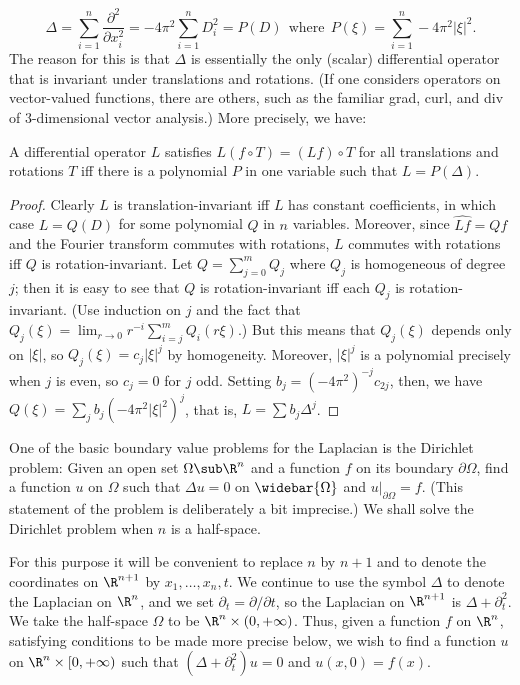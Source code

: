 \[\Delta=\sum_{i=1}^{n}\frac{\partial^2}{\partial x_i^2}=-4\pi^2\sum_{i=1}^{n}D_i^2=P(D)\ \ \text{where}\ \ P(\xi)=\sum_{i=1}^{n}-4\pi^2|\xi|^2.\]
The reason for this is that $\Delta$ is essentially the only (scalar) differential operator that is invariant under translations and rotations. (If one considers operators on vector-valued functions, there are others, such as the familiar grad, curl, and div of $3$-dimensional vector analysis.) More precisely, we have:
\begin{proposition}
A differential operator $L$ satisfies $L(f\circ T)=(Lf)\circ T$ for all translations and rotations $T$ iff there is a polynomial $P$ in one variable such that $L=P(\Delta)$.
\end{proposition}
\begin{proof}
Clearly $L$ is translation-invariant iff $L$ has constant coefficients, in which case $L=Q(D)$ for some polynomial $Q$ in $n$ variables. Moreover, since $\widehat{Lf}=Qf$ and the Fourier transform commutes with rotations, $L$ commutes with rotations iff $Q$ is rotation-invariant. Let $Q=\sum_{j=0}^{m}Q_j$ where $Q_j$ is homogeneous of degree $j$; then it is easy to see that $Q$ is rotation-invariant iff each $Q_j$ is rotation-invariant. (Use induction on $j$ and the fact that $Q_j(\xi)=\lim_{r\to 0}r^{-i}\sum_{i=j}^{m}Q_i(r\xi)$.) But this means that $Q_j(\xi)$ depends only on $|\xi|$, so $Q_j(\xi)=c_j|\xi|^j$ by homogeneity. Moreover, $|\xi|^j$ is a polynomial precisely when $j$ is even, so $c_j=0$ for $j$ odd. Setting $b_j=(-4\pi^2)^{-j}c_{2j}$, then, we have $Q(\xi)=\sum_jb_j(-4\pi^2|\xi|^2)^j$, that is, $L=\sum b_j\Delta^j$.
\end{proof}
One of the basic boundary value problems for the Laplacian is the Dirichlet problem: Given an open set $\Omega\sub\R^n$ and a function $f$ on its boundary $\partial\Omega$, find a function $u$ on $\Omega$ such that $\Delta u=0$ on $\widebar{\Omega}$ and $u|_{\partial\Omega}=f$. (This statement of the problem is deliberately a bit imprecise.) We shall solve the Dirichlet problem when $n$ is a half-space.\par
For this purpose it will be convenient to replace $n$ by $n+1$ and to denote the coordinates on $\R^{n+1}$ by $x_1,\dots,x_n,t$. We continue to use the symbol $\Delta$ to denote the Laplacian on $\R^n$, and we set $\partial_t=\partial/\partial t$, so the Laplacian on $\R^{n+1}$ is $\Delta+\partial_t^2$. We take the half-space $\Omega$ to be $\R^n\times(0,+\infty)$. Thus, given a function $f$ on $\R^n$, satisfying conditions to be made more precise below, we wish to find a function $u$ on $\R^n\times[0,+\infty)$ such that $(\Delta+\partial_t^2)u=0$ and $u(x,0)=f(x)$.\par
